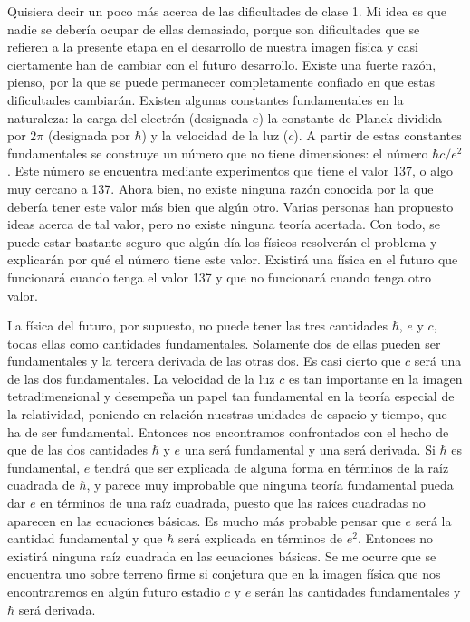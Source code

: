 \documentclass[a4paper, 12pt]{article}
\begin{document}
Quisiera decir un poco más acerca de las dificultades de clase 1. Mi idea es que nadie se debería ocupar de ellas demasiado, porque son dificultades que se refieren a la presente etapa en el desarrollo de nuestra imagen física y casi ciertamente han de cambiar con el futuro desarrollo. Existe una fuerte razón, pienso, por la que se puede permanecer completamente confiado en que estas dificultades cambiarán. Existen algunas constantes fundamentales en la naturaleza: la carga del electrón (designada $e$) la constante de Planck dividida por $2\pi$ (designada por $\hbar$) y la velocidad de la luz ($c$). A partir de estas constantes fundamentales se construye un número que no tiene dimensiones: el número $\hbar c/e^2$. Este número se encuentra mediante experimentos que tiene el valor 137, o algo muy cercano a 137. Ahora bien, no existe ninguna razón conocida por la que debería tener este valor más bien que algún otro. Varias personas han propuesto ideas acerca de tal valor, pero no existe ninguna teoría acertada. Con todo, se puede estar bastante seguro que algún día los físicos resolverán el problema y explicarán por qué el número tiene este valor. Existirá una física en el futuro que funcionará cuando  tenga el valor 137 y que no funcionará cuando tenga otro valor.

La física del futuro, por supuesto, no puede tener las tres cantidades $\hbar$,
$e$ y $c$, todas ellas como cantidades fundamentales. Solamente dos de ellas pueden ser fundamentales y la tercera derivada de las otras  dos. Es casi cierto que $c$ será una de las dos fundamentales. La velocidad de la luz $c$ es tan importante en la imagen tetradimensional y desempeña un papel tan fundamental en la teoría especial de la relatividad, poniendo en relación nuestras unidades de espacio y tiempo, que ha de ser fundamental. Entonces nos encontramos confrontados con el hecho de que de las dos cantidades $\hbar$ y $e$ una será fundamental y una será derivada. Si $\hbar$ es fundamental, $e$ tendrá que ser explicada de alguna forma en términos de la raíz cuadrada de $\hbar$, y parece muy improbable que ninguna teoría fundamental pueda dar $e$ en términos de una raíz cuadrada, puesto que las raíces cuadradas no aparecen en las ecuaciones básicas. Es mucho más probable pensar que $e$ será la cantidad fundamental y que $\hbar$ será explicada en términos de $e^2$. Entonces no existirá ninguna raíz cuadrada en las ecuaciones básicas. Se me ocurre que se encuentra uno sobre terreno firme si conjetura que en la imagen física que nos encontraremos en algún futuro estadio $c$  y $e$ serán las cantidades fundamentales y $\hbar$ será derivada.
\end{document}
